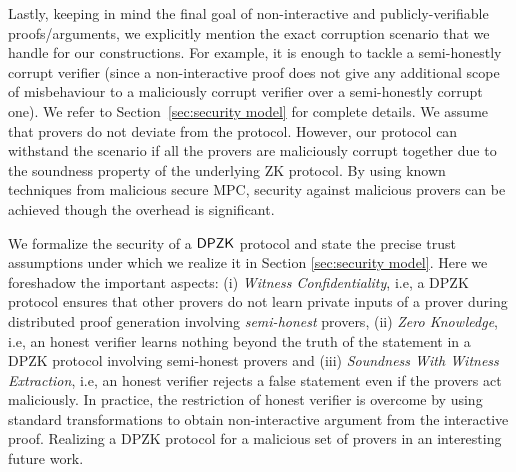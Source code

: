 {\color{brown}
Lastly, keeping in mind the final goal of non-interactive and publicly-verifiable proofs/arguments, 
we explicitly mention the exact corruption scenario that we handle for our constructions.  
For example, it is enough to tackle a semi-honestly corrupt verifier (since a non-interactive proof does not 
give any additional scope of misbehaviour to a maliciously corrupt verifier over a semi-honestly corrupt one).  
We refer to Section~\ref{sec:security model} for complete details. 
We assume that  
provers do not deviate from the protocol. However, our protocol can withstand the scenario if all the provers are maliciously 
corrupt together due to the soundness property of the underlying ZK protocol. By using known techniques from malicious secure MPC, 
security against malicious provers can be achieved though the overhead is significant. 

{\color{blue}
We formalize the security of a $\mathsf{DPZK}$ protocol and state the precise trust assumptions under which we realize it in Section \ref{sec:security model}.
Here we foreshadow the important aspects: (i) {\em Witness Confidentiality}, i.e, a DPZK protocol ensures that other provers do not learn private inputs of a prover during 
distributed proof generation involving {\em semi-honest} provers, 
(ii) {\em Zero Knowledge}, i.e, an honest verifier learns nothing beyond the truth of the statement 
in a DPZK protocol involving semi-honest provers and (iii) {\em Soundness With Witness Extraction}, i.e, an honest verifier rejects a false statement even if the provers act maliciously.
In practice, the restriction of honest verifier is overcome by using standard transformations to obtain non-interactive 
argument from the interactive proof. Realizing a DPZK protocol for a malicious set of provers in an interesting future work.
}

}

